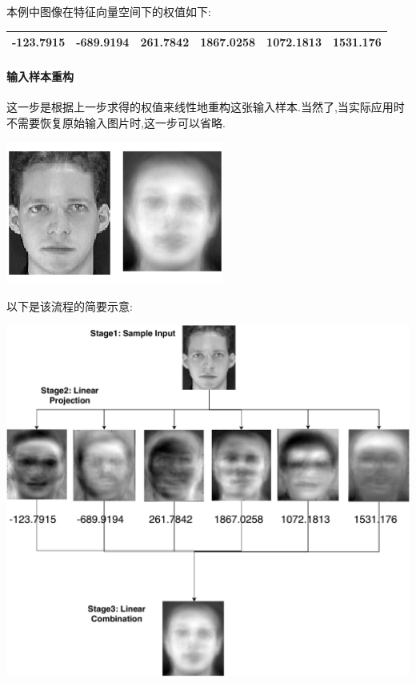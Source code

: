 本例中图像在特征向量空间下的权值如下:
\begin{center}\begin{tabular}{|l|l|l|l|l|l|}
\hline
-123.7915&-689.9194&261.7842&1867.0258&1072.1813&1531.176\\\hline
\end{tabular}
\end{center}

\paragraph{输入样本重构} 这一步是根据上一步求得的权值来线性地重构这张输入样本.当然了,当实际应用时不需要恢复原始输入图片时,这一步可以省略.

\begin{center}
\begin{minipage}[t]{\linewidth}
\center
{
\includegraphics[width=\MyFactor\textwidth]{Img/pca_sample.png} 
}
\end{minipage}
\medskip
\end{center}

	
	以下是该流程的简要示意:
\begin{center}
\begin{minipage}[t]{\linewidth}
\center
{
\includegraphics[width=\MyFactor\textwidth]{Img/pca_demo.pdf} 
}
\end{minipage}
\medskip
\end{center}

